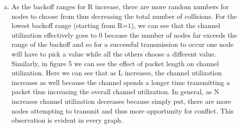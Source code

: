 \documentclass[11pt]{article}
\begin{document}
\begin{enumerate}[a.]
\item As the backoff ranges for R increase, there are more random numbers for nodes to choose from thus decreasing the total number of collisions. For the lowest backoff range (starting from R=$1$), we can see that the channel utilization effectively goes to $0$ because the number of nodes far exceeds the range of the backoff and so for a successful transmission to occur one node will have to pick a value while all the others choose a different value. Similarly, in figure 5 we can see the effect of packet length on channel utilization. Here we can see that as L increases, the channel utilization increases as well because the channel spends a longer time transmitting a packet thus increasing the overall channel utilization. In general, as N increases channel utilization decreases because simply put, there are more nodes attempting to transmit and thus more opportunity for conflict. This observation is evident in every graph.


\end{enumerate}
\end{document}
